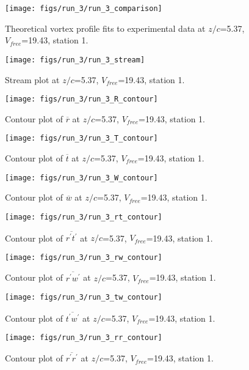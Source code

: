 \begin{figure}[H]
\centering
\texttt{[image: figs/run\_3/run\_3\_comparison]}
\caption{Theoretical vortex profile fits to experimental data at $z/c$=5.37, $V_{free}$=19.43, station 1.}
\end{figure}


\begin{figure}[H]
\centering
\texttt{[image: figs/run\_3/run\_3\_stream]}
\caption{Stream plot at $z/c$=5.37, $V_{free}$=19.43, station 1.}
\end{figure}


\begin{figure}[H]
\centering
\texttt{[image: figs/run\_3/run\_3\_R\_contour]}
\caption{Contour plot of $\overline{r}$ at $z/c$=5.37, $V_{free}$=19.43, station 1.}
\end{figure}


\begin{figure}[H]
\centering
\texttt{[image: figs/run\_3/run\_3\_T\_contour]}
\caption{Contour plot of $\overline{t}$ at $z/c$=5.37, $V_{free}$=19.43, station 1.}
\end{figure}


\begin{figure}[H]
\centering
\texttt{[image: figs/run\_3/run\_3\_W\_contour]}
\caption{Contour plot of $\overline{w}$ at $z/c$=5.37, $V_{free}$=19.43, station 1.}
\end{figure}


\begin{figure}[H]
\centering
\texttt{[image: figs/run\_3/run\_3\_rt\_contour]}
\caption{Contour plot of $\overline{r^\prime t^\prime}$ at $z/c$=5.37, $V_{free}$=19.43, station 1.}
\end{figure}


\begin{figure}[H]
\centering
\texttt{[image: figs/run\_3/run\_3\_rw\_contour]}
\caption{Contour plot of $\overline{r^\prime w^\prime}$ at $z/c$=5.37, $V_{free}$=19.43, station 1.}
\end{figure}


\begin{figure}[H]
\centering
\texttt{[image: figs/run\_3/run\_3\_tw\_contour]}
\caption{Contour plot of $\overline{t^\prime w^\prime}$ at $z/c$=5.37, $V_{free}$=19.43, station 1.}
\end{figure}


\begin{figure}[H]
\centering
\texttt{[image: figs/run\_3/run\_3\_rr\_contour]}
\caption{Contour plot of $\overline{r^\prime r^\prime}$ at $z/c$=5.37, $V_{free}$=19.43, station 1.}
\end{figure}


